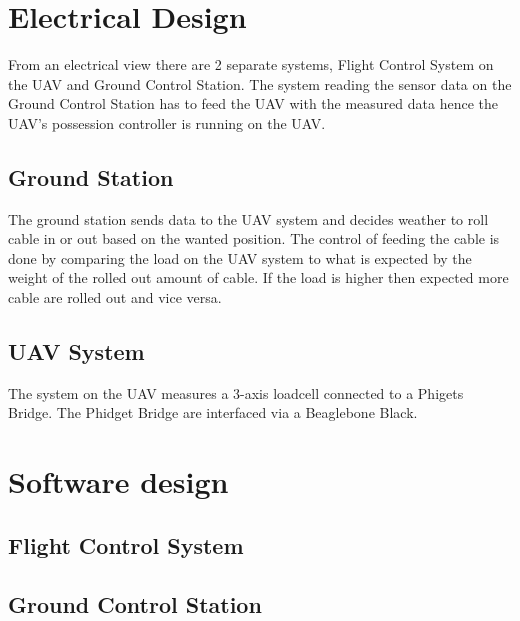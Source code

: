 \section{Electrical Design}
From an electrical view there are 2 separate systems, Flight Control System on the UAV and Ground Control Station. The system reading the sensor data on the Ground Control Station has to feed the UAV with the measured data hence the UAV's possession controller is running on the UAV. 


\subsection{Ground Station}
The ground station sends data to the UAV system and decides weather to roll cable in or out based on the wanted position. The control of feeding the cable is done by comparing the load on the UAV system to what is expected by the weight of the rolled out amount of cable. If the load is higher then expected more cable are rolled out and vice versa.  


\subsection{UAV System}
The system on the UAV measures a 3-axis loadcell connected to a Phigets Bridge. The Phidget Bridge are interfaced via a Beaglebone Black.  




\section{Software design}


\subsection{Flight Control System}


\subsection{Ground Control Station}
